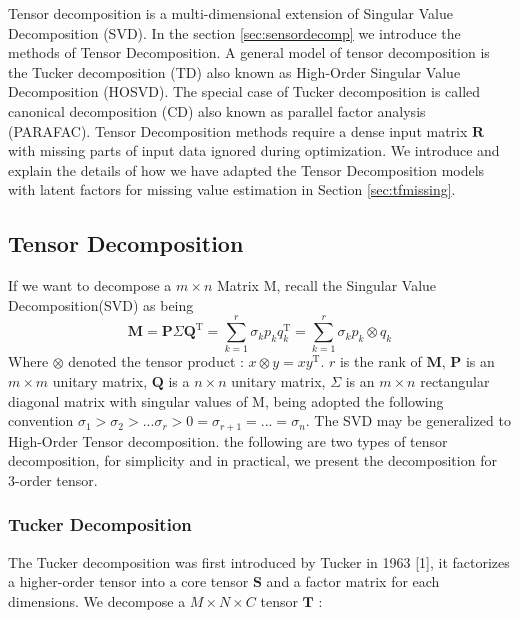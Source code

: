 Tensor decomposition is a multi-dimensional extension of Singular Value Decomposition (SVD).
In the section \ref{sec:sensordecomp} we introduce the methods of Tensor Decomposition.
A general model of tensor decomposition is the Tucker decomposition (TD) also known as High-Order Singular Value Decomposition (HOSVD).
The special case of Tucker decomposition is called canonical decomposition (CD) also known as parallel factor analysis (PARAFAC).
Tensor Decomposition methods require a dense input matrix $\mathbf{R}$ with missing parts of input data ignored during optimization.
We introduce and explain the details of how we have adapted the Tensor Decomposition models with latent factors for missing value estimation in Section \ref{sec:tfmissing}.
 
\subsection{Tensor Decomposition} \label{sec:tensordecomp}

 If we want to decompose a $m\times n$ Matrix M, recall the Singular Value Decomposition(SVD) as being
\begin{equation*} 
\mathbf{M}=\mathbf{P}\Sigma \mathbf{Q}^\mathrm{T}=\sum\limits_{k=1}^r\sigma_kp_kq_k^\mathrm{T}=\sum\limits_{k=1}^r\sigma_kp_k\otimes q_k
\end{equation*}
Where $\otimes$ denoted the tensor product : $x\otimes y = xy^\mathrm{T}$.
$r$ is the rank of $\mathbf{M}$,
$\mathbf{P}$ is an $m\times m$ unitary matrix, $\mathbf{Q}$ is a $n\times n$ unitary matrix, $\Sigma$ is an $m\times n$ rectangular diagonal matrix with singular values of M, being adopted the following convention $\sigma_1>\sigma_2 >...\sigma_r>0=\sigma_{r+1}=...=\sigma_{n}$.
The SVD may be generalized to High-Order Tensor decomposition.
the following are two types of tensor decomposition, for simplicity and in practical, we present the decomposition for 3-order tensor.

\subsubsection{Tucker Decomposition}
The Tucker decomposition was first introduced by Tucker in 1963 [1], it factorizes a higher-order tensor into a core tensor $\mathbf{S}$ and a factor matrix for each dimensions.
We decompose a $M\times N \times C $ tensor $\mathbf{T}$ :

